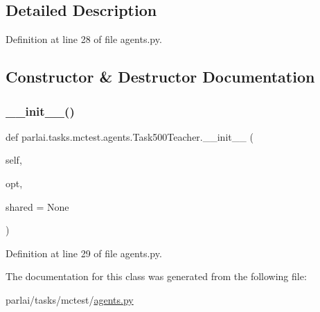 \subsection{Detailed Description}


Definition at line 28 of file agents.\+py.



\subsection{Constructor \& Destructor Documentation}
\mbox{\label{classparlai_1_1tasks_1_1mctest_1_1agents_1_1Task500Teacher_a122ab6b53f9bb97f84ae1a5e29a6deca}} 
\subsubsection{\texorpdfstring{\+\_\+\+\_\+init\+\_\+\+\_\+()}{\_\_init\_\_()}}
{\footnotesize\ttfamily def parlai.\+tasks.\+mctest.\+agents.\+Task500\+Teacher.\+\_\+\+\_\+init\+\_\+\+\_\+ (\begin{DoxyParamCaption}\item[{}]{self,  }\item[{}]{opt,  }\item[{}]{shared = {\ttfamily None} }\end{DoxyParamCaption})}



Definition at line 29 of file agents.\+py.



The documentation for this class was generated from the following file\+:\begin{DoxyCompactItemize}
\item 
parlai/tasks/mctest/\hyperlink{parlai_2tasks_2mctest_2agents_8py}{agents.\+py}\end{DoxyCompactItemize}

